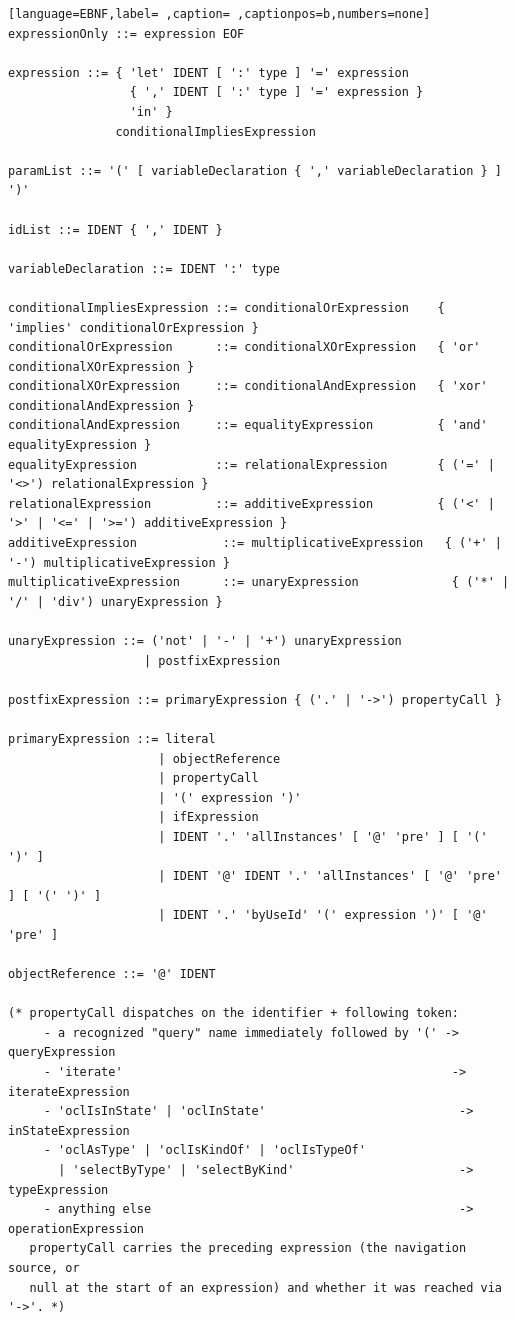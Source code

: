 \documentclass[11pt,twoside,a4paper]{book}
\begin{document}
\begin{lstlisting}[language=EBNF,label= ,caption= ,captionpos=b,numbers=none]
expressionOnly ::= expression EOF

expression ::= { 'let' IDENT [ ':' type ] '=' expression
                 { ',' IDENT [ ':' type ] '=' expression }
                 'in' }
               conditionalImpliesExpression

paramList ::= '(' [ variableDeclaration { ',' variableDeclaration } ] ')'

idList ::= IDENT { ',' IDENT }

variableDeclaration ::= IDENT ':' type

conditionalImpliesExpression ::= conditionalOrExpression    { 'implies' conditionalOrExpression }
conditionalOrExpression      ::= conditionalXOrExpression   { 'or' conditionalXOrExpression }
conditionalXOrExpression     ::= conditionalAndExpression   { 'xor' conditionalAndExpression }
conditionalAndExpression     ::= equalityExpression         { 'and' equalityExpression }
equalityExpression           ::= relationalExpression       { ('=' | '<>') relationalExpression }
relationalExpression         ::= additiveExpression         { ('<' | '>' | '<=' | '>=') additiveExpression }
additiveExpression            ::= multiplicativeExpression   { ('+' | '-') multiplicativeExpression }
multiplicativeExpression      ::= unaryExpression             { ('*' | '/' | 'div') unaryExpression }

unaryExpression ::= ('not' | '-' | '+') unaryExpression
                   | postfixExpression

postfixExpression ::= primaryExpression { ('.' | '->') propertyCall }

primaryExpression ::= literal
                     | objectReference
                     | propertyCall
                     | '(' expression ')'
                     | ifExpression
                     | IDENT '.' 'allInstances' [ '@' 'pre' ] [ '(' ')' ]
                     | IDENT '@' IDENT '.' 'allInstances' [ '@' 'pre' ] [ '(' ')' ]
                     | IDENT '.' 'byUseId' '(' expression ')' [ '@' 'pre' ]

objectReference ::= '@' IDENT

(* propertyCall dispatches on the identifier + following token:
     - a recognized "query" name immediately followed by '(' -> queryExpression
     - 'iterate'                                              -> iterateExpression
     - 'oclIsInState' | 'oclInState'                           -> inStateExpression
     - 'oclAsType' | 'oclIsKindOf' | 'oclIsTypeOf'
       | 'selectByType' | 'selectByKind'                       -> typeExpression
     - anything else                                           -> operationExpression
   propertyCall carries the preceding expression (the navigation source, or
   null at the start of an expression) and whether it was reached via '->'. *)


\end{lstlisting}
\end{document}
